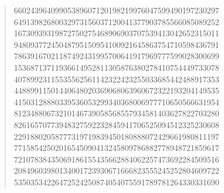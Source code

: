 \documentclass[oneside,12pt]{book}   	%
\newcounter{ex}
\newcounter{pr}
\theoremstyle{definition}
\begin{document}
\begin{spacing}{1.618}
\begin{quote}
66024396409905389607120198219976047599490197230297 \\
64913982680032973156037120041377903785566085089252 \\
16730939319872750275468906903707539413042652315011 \\
94809377245048795150954100921645863754710598436791 \\
78639167021187492431995700641917969777599028300699 \\
15368713711936614952811305876380278410754449733078 \\
40789923115535562561142322423255033685442488917353 \\
44889911501440648020369068063960672322193204149535 \\
41503128880339536053299340368006977710650566631954 \\
81234880673210146739058568557934581403627822703280 \\
82616570773948327592232845941706525094512325230608 \\
22918802058777319719839450180888072429661980811197 \\
77158542502016545090413245809786882778948721859617 \\
72107838435069186155435662884062257473692284509516 \\
20849603980134001723930671666823555245252804609722 \\
53503534226472524250874054075591789781264330331690 
		\end{quote}
	
		
	
		
	\printindex
\end{spacing}
\end{document}
